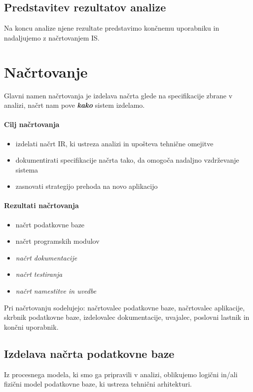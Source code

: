 \documentclass[a4paper,12pt]{report}
\begin{document}
   \subsection{Predstavitev rezultatov analize}
   Na koncu analize njene rezultate predstavimo končnemu uporabniku in nadaljujemo z načrtovanjem IS.

   \section{Načrtovanje}
   Glavni namen načrtovanja je izdelava načrta glede na specifikacije zbrane v analizi, načrt nam pove \textit{\textbf{kako}} sistem izdelamo.

   \paragraph{Cilj načrtovanja}
   \begin{itemize}
      \item izdelati načrt IR, ki ustreza analizi in upošteva tehnične omejitve
      \item dokumentirati specifikacije načrta tako, da omogoča nadaljno vzdrževanje sistema
      \item zasnovati strategijo prehoda na novo aplikacijo
   \end{itemize}

   \paragraph{Rezultati načrtovanja}
   \begin{itemize}
      \item načrt podatkovne baze
      \item načrt programskih modulov
      \item \textit{načrt dokumentacije}
      \item \textit{načrt testiranja}
      \item \textit{načrt namestitve in uvedbe}
   \end{itemize}
   Pri načrtovanju sodelujejo: načrtovalec podatkovne baze, načrtovalec aplikacije, skrbnik podatkovne baze, izdelovalec dokumentacije,
   uvajalec, poslovni lastnik in končni uporabnik.

   \subsection{Izdelava načrta podatkovne baze}
   Iz procesnega modela, ki smo ga pripravili v analizi, oblikujemo logični in/ali fizični model podatkovne baze, ki ustreza tehnični arhitekturi.
\end{document}
